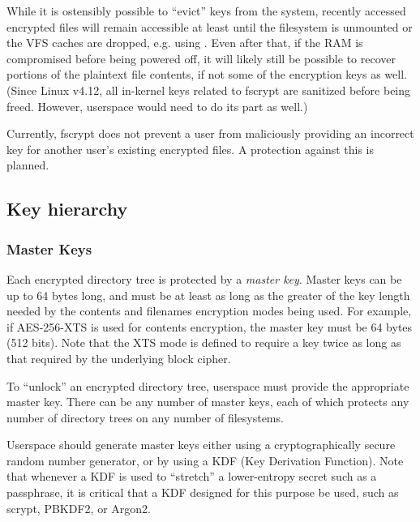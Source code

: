 \documentclass[a4paper,8pt,english]{sphinxmanual}
\begin{document}
While it is ostensibly possible to ``evict'' keys from the system,
recently accessed encrypted files will remain accessible at least
until the filesystem is unmounted or the VFS caches are dropped, e.g.
using .  Even after that, if the
RAM is compromised before being powered off, it will likely still be
possible to recover portions of the plaintext file contents, if not
some of the encryption keys as well.  (Since Linux v4.12, all
in-kernel keys related to fscrypt are sanitized before being freed.
However, userspace would need to do its part as well.)

Currently, fscrypt does not prevent a user from maliciously providing
an incorrect key for another user's existing encrypted files.  A
protection against this is planned.


\subsection{Key hierarchy}
\label{filesystems/fscrypt:key-hierarchy}

\subsubsection{Master Keys}
\label{filesystems/fscrypt:master-keys}
Each encrypted directory tree is protected by a \emph{master key}.  Master
keys can be up to 64 bytes long, and must be at least as long as the
greater of the key length needed by the contents and filenames
encryption modes being used.  For example, if AES-256-XTS is used for
contents encryption, the master key must be 64 bytes (512 bits).  Note
that the XTS mode is defined to require a key twice as long as that
required by the underlying block cipher.

To ``unlock'' an encrypted directory tree, userspace must provide the
appropriate master key.  There can be any number of master keys, each
of which protects any number of directory trees on any number of
filesystems.

Userspace should generate master keys either using a cryptographically
secure random number generator, or by using a KDF (Key Derivation
Function).  Note that whenever a KDF is used to ``stretch'' a
lower-entropy secret such as a passphrase, it is critical that a KDF
designed for this purpose be used, such as scrypt, PBKDF2, or Argon2.
\end{document}
